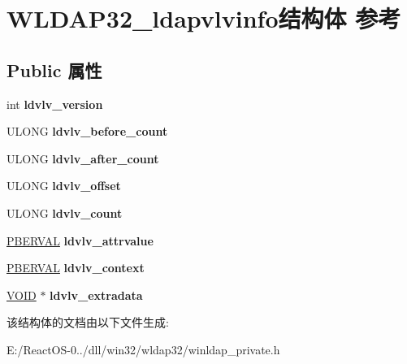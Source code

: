 \hypertarget{struct_w_l_d_a_p32__ldapvlvinfo}{}\section{W\+L\+D\+A\+P32\+\_\+ldapvlvinfo结构体 参考}
\label{struct_w_l_d_a_p32__ldapvlvinfo}
\subsection*{Public 属性}
\begin{DoxyCompactItemize}
\item 
\mbox{\label{struct_w_l_d_a_p32__ldapvlvinfo_ad93cb27449c7075dcde3384181460345}} 
int {\bfseries ldvlv\+\_\+version}
\item 
\mbox{\label{struct_w_l_d_a_p32__ldapvlvinfo_abdc753102959ab367db3c02cddd05e28}} 
U\+L\+O\+NG {\bfseries ldvlv\+\_\+before\+\_\+count}
\item 
\mbox{\label{struct_w_l_d_a_p32__ldapvlvinfo_a208027d33c0d2410438a0f6eff80d835}} 
U\+L\+O\+NG {\bfseries ldvlv\+\_\+after\+\_\+count}
\item 
\mbox{\label{struct_w_l_d_a_p32__ldapvlvinfo_af660a50aada6730364a5145f3acda158}} 
U\+L\+O\+NG {\bfseries ldvlv\+\_\+offset}
\item 
\mbox{\label{struct_w_l_d_a_p32__ldapvlvinfo_a27784533d8ad30fdd5c76c9a17a7e007}} 
U\+L\+O\+NG {\bfseries ldvlv\+\_\+count}
\item 
\mbox{\label{struct_w_l_d_a_p32__ldapvlvinfo_a4bfed331dbb1ddf416769894dcbcfd22}} 
\hyperlink{struct_w_l_d_a_p32__berval}{P\+B\+E\+R\+V\+AL} {\bfseries ldvlv\+\_\+attrvalue}
\item 
\mbox{\label{struct_w_l_d_a_p32__ldapvlvinfo_a647ab6d560d29d27f98008d6f5a8aa2f}} 
\hyperlink{struct_w_l_d_a_p32__berval}{P\+B\+E\+R\+V\+AL} {\bfseries ldvlv\+\_\+context}
\item 
\mbox{\label{struct_w_l_d_a_p32__ldapvlvinfo_a1f4a98697bfd3443e787c848b22eab53}} 
\hyperlink{interfacevoid}{V\+O\+ID} $\ast$ {\bfseries ldvlv\+\_\+extradata}
\end{DoxyCompactItemize}


该结构体的文档由以下文件生成\+:\begin{DoxyCompactItemize}
\item 
E\+:/\+React\+O\+S-\/0../dll/win32/wldap32/winldap\+\_\+private.\+h\end{DoxyCompactItemize}
